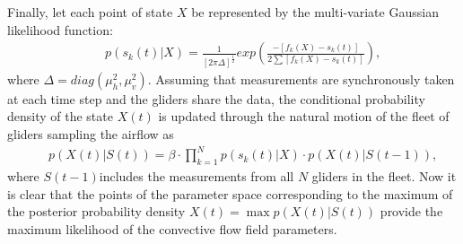 \documentclass{ifacconf}
\begin{document}
Finally, let each point of state $X$ be represented by the
multi-variate Gaussian likelihood function:
\begin{eqnarray*}
    && p(s_k(t)\vert X)=\frac{1}{[2\pi \Delta]^\frac{1}{2}}  exp( \frac{-[f_k(X)-s_k(t)]}{2 \sum
    [f_k(X)-s_k(t)] }),
    \label{eq:BayesLikeLH}
\end{eqnarray*}
where $\Delta=diag(\mu^2_h,\mu^2_v)$. Assuming that measurements are
synchronously taken at each time step and the gliders share the
data, the conditional probability density of the state $X(t)$ is updated
through the natural motion of the fleet of gliders sampling the airflow as
\begin{eqnarray}
    && p(X(t)\vert S(t))=\beta \cdot \prod_{k=1}^N p(s_k(t) \vert X)\cdot p(X(t) \vert S(t-1)),
    \label{eq:PostProb}
\end{eqnarray}
where $S(t-1)$includes the measurements from all $N$ gliders in the fleet.
Now it is clear that the points of the parameter space corresponding to the
maximum of the posterior probability density $X(t)=\max p(X(t) \vert S(t))$
provide the maximum likelihood of the convective flow field parameters.
%
\end{document}
